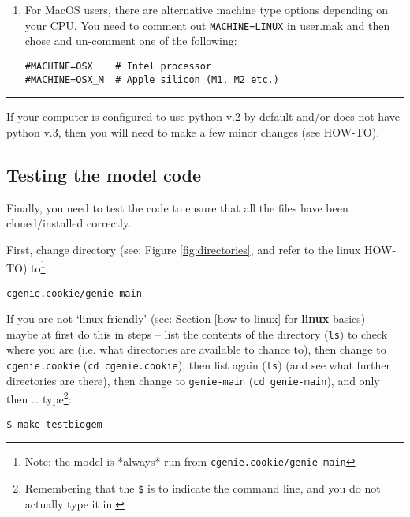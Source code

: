 \begin{itemize}
\begin{enumerate}[noitemsep]
\vspace{2mm}
\item For MacOS users, there are alternative machine type options depending on your CPU. You need to comment out \texttt{MACHINE=LINUX} in  \textsf{\footnotesize user.mak} and then chose and un-comment one of the following:
\small\begin{verbatim}
#MACHINE=OSX	# Intel processor
#MACHINE=OSX_M	# Apple silicon (M1, M2 etc.)
\end{verbatim}\normalsize

\end{enumerate}

\end{itemize}

\vspace{1mm}\noindent\rule{4cm}{0.5pt}\vspace{2mm}

\noindent If your computer is configured to use python v.2 by default and/or does not have python v.3, then you will need to make a few minor changes (see HOW-TO).

\newpage

\subsection{Testing the model code}

\noindent Finally, you need to test the code to ensure that all the files have been cloned/installed correctly.

\vspace{1mm} 
\noindent First, change directory (see: Figure \ref{fig:directories}, and refer to the linux HOW-TO) to\footnote{Note: the model is *always* run from \texttt{cgenie.cookie/genie-main}}:
\vspace{-2mm}\begin{verbatim}
cgenie.cookie/genie-main
\end{verbatim}\vspace{-2mm}

\noindent If you are not ‘linux-friendly’ (see: Section \ref{how-to-linux} for \textbf{linux} basics) – maybe at first do this in steps – list the contents of the directory (\texttt{ls}) to check where you are (i.e. what directories are available to chance to), then change to \texttt{cgenie.cookie} (\texttt{cd cgenie.cookie}), then list again (\texttt{ls}) (and see what further directories are there), then change to \texttt{genie-main} (\texttt{cd genie-main}), and only then … type\footnote{Remembering that the \texttt{\$} is to indicate the command line, and you do not actually type it in.}:
\vspace{-2mm}\begin{verbatim}
$ make testbiogem
\end{verbatim}\vspace{-2mm}

